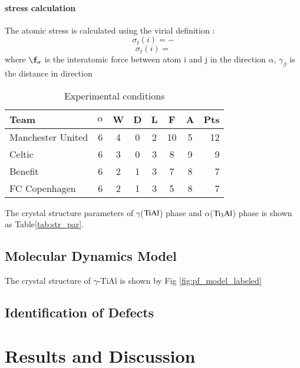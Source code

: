 \documentclass[final,5p,times,twocolumn]{elsarticle}
\begin{document}
\paragraph{stress calculation}
The atomic stress is calculated using the virial definition :
$$\sigma_t(i)=-$$
$$\sigma_t(i)= $$
where $\f_\alpha$ is the interatomic force between atom i and j in the direction $\alpha$, $\gamma_\beta$ is the distance in direction 
\begin{table}[H]
\centering
\caption{Experimental conditions}
\begin{tabular}{l*{6}{c}r}	
		\hline
		Team              & $\alpha$ & W & D & L & F  & A & Pts \\
		\hline
		Manchester United & 6 & 4 & 0 & 2 & 10 & 5 & 12  \\
		Celtic            & 6 & 3 & 0 & 3 &  8 & 9 &  9  \\
		Benefit           & 6 & 2 & 1 & 3 &  7 & 8 &  7  \\
		FC Copenhagen     & 6 & 2 & 1 & 3 &  5 & 8 &  7  \\
		\hline
\end{tabular}
\label{Tab:par}
\end{table}
The crystal structure parameters of $\gamma$($\rm TiAl$) phase and $\alpha$($\rm Ti_3Al$) phase is shown as Table\ref{tab:str_par}. 
\subsection{Molecular Dynamics Model}
The crystal structure of $\gamma$-TiAl
is shown by Fig \ref{fig:pf_model_labeled}
\subsection{Identification of Defects}
\section{Results and Discussion}
\end{document}
